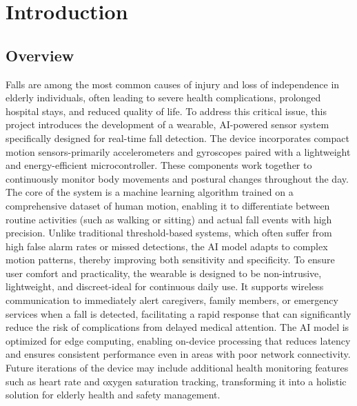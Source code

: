 \documentclass[a4paper, 12pt]{report}
\makeatletter
\let\ps@plainorig\ps@plain
\let\ps@plain\ps@titlepagelayout
\makeatother
\begin{document}
\setcounter{page}{1}

\makeatletter
\let\ps@plain\ps@plainorig
\makeatother

\pagestyle{plain}

\titlespacing*{\chapter}{0pt}{-30pt}{5pt}
\setlength{\parindent}{32pt}

\chapter{Introduction}

\section{Overview}
Falls are among the most common causes of injury and loss of independence in elderly individuals, often leading to severe health complications, prolonged hospital stays, and reduced quality of life. To address this critical issue, this project introduces the development of a wearable, AI-powered sensor system specifically designed for real-time fall detection. The device incorporates compact motion sensors-primarily accelerometers and gyroscopes paired with a lightweight and energy-efficient microcontroller. These components work together to continuously monitor body movements and postural changes throughout the day.
The core of the system is a machine learning algorithm trained on a comprehensive dataset of human motion, enabling it to differentiate between routine activities (such as walking or sitting) and actual fall events with high precision. Unlike traditional threshold-based systems, which often suffer from high false alarm rates or missed detections, the AI model adapts to complex motion patterns, thereby improving both sensitivity and specificity.
To ensure user comfort and practicality, the wearable is designed to be non-intrusive, lightweight, and discreet-ideal for continuous daily use. It supports wireless communication to immediately alert caregivers, family members, or emergency services when a fall is detected, facilitating a rapid response that can significantly reduce the risk of complications from delayed medical attention.
The AI model is optimized for edge computing, enabling on-device processing that reduces latency and ensures consistent performance even in areas with poor network connectivity. Future iterations of the device may include additional health monitoring features such as heart rate and oxygen saturation tracking, transforming it into a holistic solution for elderly health and safety management.
\end{document}

